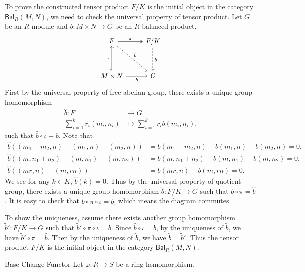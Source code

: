 \begin{prf}
    To prove the constructed tensor product $F/K$ is the initial object in the category $\mathsf{Bal}_R(M, N)$, we need to check the universal property of tensor product. Let $G$ be an $R$-module and $b:M\times N\to G$ be an $R$-balanced product. 
    \[
        \begin{tikzcd}
            F \arrow[r, "\pi", two heads] \arrow[rd, "\hat{b}", dashed] & F/K \arrow[d, "\tilde{b}", dashed] \\[1.5em]
            M\times N \arrow[u, "\iota", hook] \arrow[r, "b"']          & G                                 
        \end{tikzcd}
    \]
    First by the universal property of free abelian group, there exists a unique group homomorphism
    \begin{align*}
        \hat{b}:F&\longrightarrow G\\
        \sum_{i=1}^k r_i(m_i, n_i)&\longmapsto \sum_{i=1}^k r_ib(m_i, n_i).
    \end{align*}
    such that $\hat{b}\circ\iota=b$. Note that
    \begin{align*}
        \hat{b}\left((m_1+m_2, n)-(m_1, n)-(m_2, n)\right) &= b(m_1+m_2, n)-b(m_1, n)-b(m_2, n)=0,\\
        \hat{b}\left((m, n_1+n_2)-(m, n_1)-(m, n_2)\right) &= b(m, n_1+n_2)-b(m, n_1)-b(m, n_2)=0,\\
        \hat{b}\left((mr, n)-(m, rn)\right) &= b(mr, n)-b(m, rn)=0.
    \end{align*}
    We see for any $k\in K$, $\hat{b}(k)=0$. Thus by the universal property of quotient group, there exists a unique group homomorphism $\tilde{b}:F/K\to G$ such that $\tilde{b}\circ\pi=\hat{b}$. It is easy to check that $\tilde{b}\circ\pi\circ\iota=b$, which means the diagram commutes. 

    To show the uniqueness, assume there exists another group homomorphism $\tilde{b}':F/K\to G$ such that $\tilde{b}'\circ\pi\circ\iota=b$. Since $\hat{b}\circ \iota=b$, by the uniqueness of $\tilde{b}$, we have $\tilde{b}'\circ\pi=\hat{b}$. Then by the uniqueness of $\tilde{b}$, we have $\tilde{b}=\tilde{b}'$. Thus the tensor product $F/K$ is the initial object in the category $\mathsf{Bal}_R(M, N)$.
\end{prf}

\begin{proposition}{Base Change Functor}{}
    Let $\varphi:R\to S$ be a ring homomorphism. 
\end{proposition}

